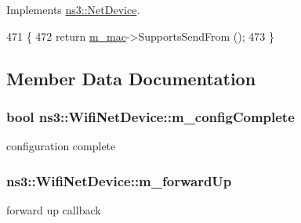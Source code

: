 Implements \hyperlink{classns3_1_1NetDevice_a04793d220b54c40e110ebf86dae5b25c}{ns3\+::\+Net\+Device}.


\begin{DoxyCode}
471 \{
472   \textcolor{keywordflow}{return} \hyperlink{classns3_1_1WifiNetDevice_ad7a7042abee418dcdbf4b4a870f5d4cf}{m\_mac}->SupportsSendFrom ();
473 \}
\end{DoxyCode}


\subsection{Member Data Documentation}
\subsubsection[{\texorpdfstring{m\+\_\+config\+Complete}{m_configComplete}}]{\setlength{\rightskip}{0pt plus 5cm}bool ns3\+::\+Wifi\+Net\+Device\+::m\+\_\+config\+Complete\hspace{0.3cm}{\ttfamily [private]}}\hypertarget{classns3_1_1WifiNetDevice_a46798e25d3a4dafd5d72c1ba04ca3c01}{}\label{classns3_1_1WifiNetDevice_a46798e25d3a4dafd5d72c1ba04ca3c01}


configuration complete 

\subsubsection[{\texorpdfstring{m\+\_\+forward\+Up}{m_forwardUp}}]{ ns3\+::\+Wifi\+Net\+Device\+::m\+\_\+forward\+Up\hspace{0.3cm}{\ttfamily [private]}}\hypertarget{classns3_1_1WifiNetDevice_a5be7dca73f370729fee15c73bec55867}{}\label{classns3_1_1WifiNetDevice_a5be7dca73f370729fee15c73bec55867}


forward up callback 

